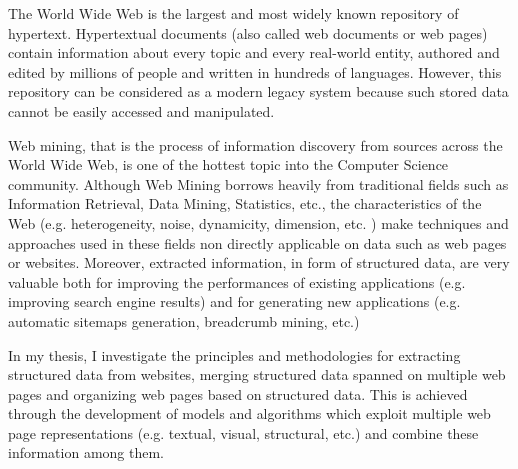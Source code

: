 


The World Wide Web is the largest and most widely known repository of hypertext. Hypertextual documents (also called web documents or web pages) contain information about every topic and every real-world entity, authored and edited by millions of people and written in hundreds of languages. However, this repository can be considered as a modern legacy system because such stored data cannot be easily accessed and manipulated.

Web mining, that is  the process of information discovery from sources across the World Wide Web, is one of the hottest topic into the Computer Science community.  Although Web Mining borrows heavily from traditional fields such as Information Retrieval, Data Mining, Statistics, etc., the characteristics of the Web (e.g. heterogeneity, noise, dynamicity, dimension, etc. ) make techniques and approaches used in these fields non directly applicable on data such as web pages or websites. Moreover, extracted information, in form of structured data, are very valuable both for improving the performances of existing applications (e.g. improving search engine results) and for generating new applications (e.g. automatic sitemaps generation, breadcrumb mining, etc.)

In my thesis, I investigate the principles and methodologies for extracting structured data from websites, merging structured data spanned on multiple web pages and organizing web pages based on structured data. This is achieved through the development of models and algorithms  which exploit multiple web page representations (e.g. textual, visual, structural, etc.) and combine these information among them.
